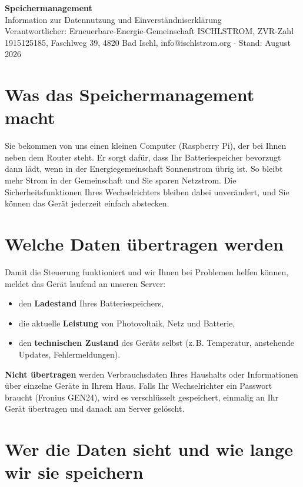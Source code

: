 \documentclass[a4paper,10pt]{article}
\begin{document}
\begin{center}
    {\LARGE\bfseries Speichermanagement}\\[0.3em]
    {\large Information zur Datennutzung und Einverständniserklärung}\\[0.3em]
    {\small Verantwortlicher: Erneuerbare-Energie-Gemeinschaft ISCHLSTROM,
     ZVR-Zahl 1915125185, Faschlweg 39, 4820 Bad Ischl,
     info@ischlstrom.org \(\cdot\) Stand: August 2026}
\end{center}

\section*{Was das Speichermanagement macht}

Sie bekommen von uns einen kleinen Computer (Raspberry Pi), der bei Ihnen
neben dem Router steht. Er sorgt dafür, dass Ihr Batteriespeicher bevorzugt
dann lädt, wenn in der Energiegemeinschaft Sonnenstrom übrig ist. So bleibt
mehr Strom in der Gemeinschaft und Sie sparen Netzstrom. Die
Sicherheitsfunktionen Ihres Wechselrichters bleiben dabei unverändert, und
Sie können das Gerät jederzeit einfach abstecken.

\section*{Welche Daten übertragen werden}

Damit die Steuerung funktioniert und wir Ihnen bei Problemen helfen können,
meldet das Gerät laufend an unseren Server:

\begin{itemize}[nosep]
    \item den \textbf{Ladestand} Ihres Batteriespeichers,
    \item die aktuelle \textbf{Leistung} von Photovoltaik, Netz und Batterie,
    \item den \textbf{technischen Zustand} des Geräts selbst
          (z.\,B. Temperatur, anstehende Updates, Fehlermeldungen).
\end{itemize}

\textbf{Nicht übertragen} werden Verbrauchsdaten Ihres Haushalts oder
Informationen über einzelne Geräte in Ihrem Haus. Falls Ihr
Wechselrichter ein Passwort braucht (Fronius GEN24), wird es
verschlüsselt gespeichert, einmalig an Ihr Gerät übertragen und danach
am Server gelöscht.

\section*{Wer die Daten sieht und wie lange wir sie speichern}
\end{document}
